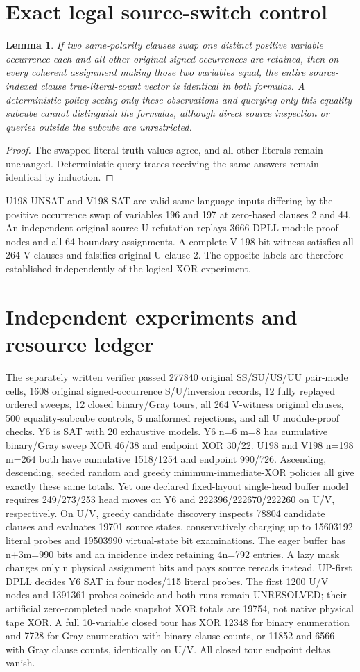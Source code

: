 \documentclass{article}
\newtheorem{lemma}{Lemma}
\begin{document}
\section{Exact legal source-switch control}
\begin{lemma}
If two same-polarity clauses swap one distinct positive variable occurrence each and all other original signed occurrences are retained, then on every coherent assignment making those two variables equal, the entire source-indexed clause true-literal-count vector is identical in both formulas. A deterministic policy seeing only these observations and querying only this equality subcube cannot distinguish the formulas, although direct source inspection or queries outside the subcube are unrestricted.
\end{lemma}
\begin{proof}The swapped literal truth values agree, and all other literals remain unchanged. Deterministic query traces receiving the same answers remain identical by induction.\end{proof}
U198 UNSAT and V198 SAT are valid same-language inputs differing by the positive occurrence swap of variables 196 and 197 at zero-based clauses 2 and 44. An independent original-source U refutation replays 3666 DPLL module-proof nodes and all 64 boundary assignments. A complete V 198-bit witness satisfies all 264 V clauses and falsifies original U clause 2. The opposite labels are therefore established independently of the logical XOR experiment.
\section{Independent experiments and resource ledger}
The separately written verifier passed 277840 original SS/SU/US/UU pair-mode cells, 1608 original signed-occurrence S/U/inversion records, 12 fully replayed ordered sweeps, 12 closed binary/Gray tours, all 264 V-witness original clauses, 500 equality-subcube controls, 5 malformed rejections, and all U module-proof checks. Y6 is SAT with 20 exhaustive models.
Y6 n=6 m=8 has cumulative binary/Gray sweep XOR 46/38 and endpoint XOR 30/22. U198 and V198 n=198 m=264 both have cumulative 1518/1254 and endpoint 990/726. Ascending, descending, seeded random and greedy minimum-immediate-XOR policies all give exactly these same totals. Yet one declared fixed-layout single-head buffer model requires 249/273/253 head moves on Y6 and 222396/222670/222260 on U/V, respectively. On U/V, greedy candidate discovery inspects 78804 candidate clauses and evaluates 19701 source states, conservatively charging up to 15603192 literal probes and 19503990 virtual-state bit examinations. The eager buffer has n+3m=990 bits and an incidence index retaining 4n=792 entries. A lazy mask changes only n physical assignment bits and pays source rereads instead.
UP-first DPLL decides Y6 SAT in four nodes/115 literal probes. The first 1200 U/V nodes and 1391361 probes coincide and both runs remain UNRESOLVED; their artificial zero-completed node snapshot XOR totals are 19754, not native physical tape XOR. A full 10-variable closed tour has XOR 12348 for binary enumeration and 7728 for Gray enumeration with binary clause counts, or 11852 and 6566 with Gray clause counts, identically on U/V. All closed tour endpoint deltas vanish.
\end{document}
